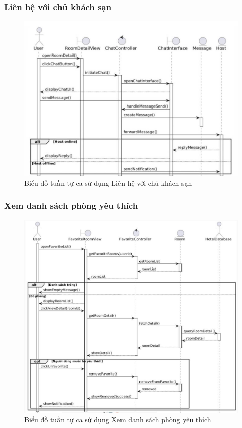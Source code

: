 \subsubsection{Liên hệ với chủ khách sạn}
\begin{figure}[H]
    \centering
    \includegraphics[width=\textwidth]{img2/chat.jpg}
    \caption{Biểu đồ tuần tự ca sử dụng Liên hệ với chủ khách sạn}
\end{figure}

\subsubsection{Xem danh sách phòng yêu thích}
\begin{figure}[H]
    \centering
    \includegraphics[width=\textwidth]{img2/xemphongyeuthich.jpg}
    \caption{Biểu đồ tuần tự ca sử dụng Xem danh sách phòng yêu thích}
\end{figure}

